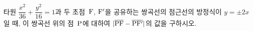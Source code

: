 타원 $\dfrac{x^2}{36}+\dfrac{y^2}{16}=1$과 두 초점~$\mathrm{F}$, $\mathrm{F'}$을 공유하는 쌍곡선의 점근선의 방정식이 $y=\pm 2x$일 때, 이 쌍곡선 위의 점~$\mathrm{P}$에 대하여 $|\overline{\mathrm{PF}}-\overline{\mathrm{PF'}}|$의 값을 구하시오.
